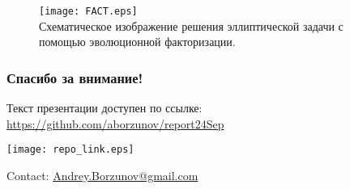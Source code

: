 \documentclass{beamer}
\begin{document}
\begin{frame}
    \begin{figure}
        \texttt{[image: FACT.eps]}
        \\ Схематическое изображение решения эллиптической задачи с помощью эволюционной факторизации.
    \end{figure}
\end{frame}


\begin{frame}[allowframebreaks]
    
\end{frame}

\begin{frame}
    \frametitle{Спасибо за внимание!}
    Текст презентации доступен по ссылке:
    \url{https://github.com/aborzunov/report24Sep}
    \begin{figure*}
        \texttt{[image: repo\_link.eps]}
    \end{figure*}
     Contact: \url{Andrey.Borzunov@gmail.com}

\end{frame}
\end{document}
